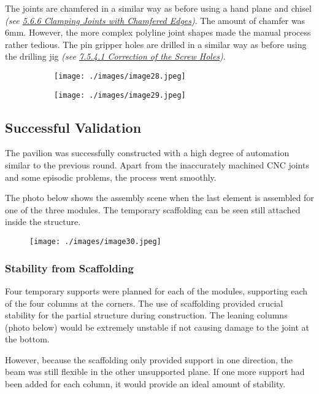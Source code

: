 The joints are chamfered in a similar way as before using a hand plane and chisel \textit{(see \uline{5.6.6 Clamping Joints with Chamfered Edges})}. The amount of chamfer was 6mm. However, the more complex polyline joint shapes made the manual process rather tedious. The pin gripper holes are drilled in a similar way as before using the drilling jig \textit{(see \uline{7.5.4.1 Correction of the Screw Holes})}.

\begin{figure}[H]
\centering
\begin{subfigure}[b]{0.45\textwidth}
\centering
\texttt{[image: ./images/image28.jpeg]}
\end{subfigure}
\hfill
\begin{subfigure}[b]{0.45\textwidth}
\centering
\texttt{[image: ./images/image29.jpeg]}
\end{subfigure}
\end{figure}


\subsection{Successful Validation}

The pavilion was successfully constructed with a high degree of automation similar to the previous round. Apart from the inaccurately machined CNC joints and some episodic problems, the process went smoothly. 

The photo below shows the assembly scene when the last element is assembled for one of the three modules. The temporary scaffolding can be seen still attached inside the structure. 

\begin{figure}[H]
\texttt{[image: ./images/image30.jpeg]}
\end{figure}


\subsubsection{Stability from Scaffolding}

Four temporary supports were planned for each of the modules, supporting each of the four columns at the corners. The use of scaffolding provided crucial stability for the partial structure during construction. The leaning columns (photo below) would be extremely unstable if not causing damage to the joint at the bottom. 

However, because the scaffolding only provided support in one direction, the beam was still flexible in the other unsupported plane. If one more support had been added for each column, it would provide an ideal amount of stability. 

